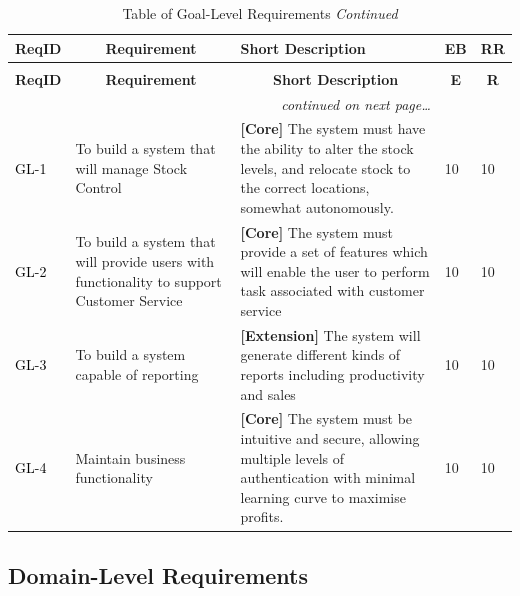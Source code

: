 \documentclass[a4paper]{article}
\begin{document}
\begin{longtable}{|l|p{5cm}|p{7cm}|p{0.5cm}|p{0.5cm}|}
  \caption{Table of Goal-Level Requirements}\\
  \hline
  \multicolumn{1}{|c|}{\textbf{ReqID}}  &
  \multicolumn{1}{|c|}{\textbf{Requirement}} &
  \textbf{Short Description}&
  \textbf{EB} & 
  \textbf{RR}\\
  \hline\hline
  \endfirsthead
  \caption[]{Table of Goal-Level Requirements \textit{Continued}}\\
  \hline
  \multicolumn{1}{|c|}{\textbf{ReqID}} &
  \multicolumn{1}{|c|}{\textbf{Requirement}} &
  \multicolumn{1}{|c|}{\textbf{Short Description}} & 
  \multicolumn{1}{|c|}{\textbf{E}} & 
  \multicolumn{1}{|c|}{\textbf{R}}\\
  \hline\hline
  \endhead
  \hline
  \multicolumn{3}{r}{\textit{continued on next page\ldots}}\\
  \endfoot
  \hline
  \endlastfoot
  \textcolor{black}{GL-1}  &  To build a system that will manage Stock Control     & \textbf{[Core] }The system must have the ability to alter the stock levels, and relocate stock to the correct locations, somewhat autonomously. & 10 & 10 \\
  \hline
 \textcolor{black}{ GL-2}  &  To build a system that will provide users with functionality to support Customer Service & \textbf{[Core] }The system must provide a set of features which will enable the user to perform task associated with customer service & 10 & 10\\
  \hline
  \textcolor{black}{GL-3}  &  To build a system capable of reporting & \textbf{[Extension] }The system will generate different kinds of reports including productivity and sales & 10 & 10 \\
  \hline
  \textcolor{black}{GL-4}  &  Maintain business functionality &  \textbf{[Core] }The system must be intuitive and secure, allowing multiple levels of authentication with minimal learning curve to maximise profits.& 10 & 10 \\
  \hline
\end{longtable}

\pagebreak
\subsection{Domain-Level Requirements}
\end{document}
